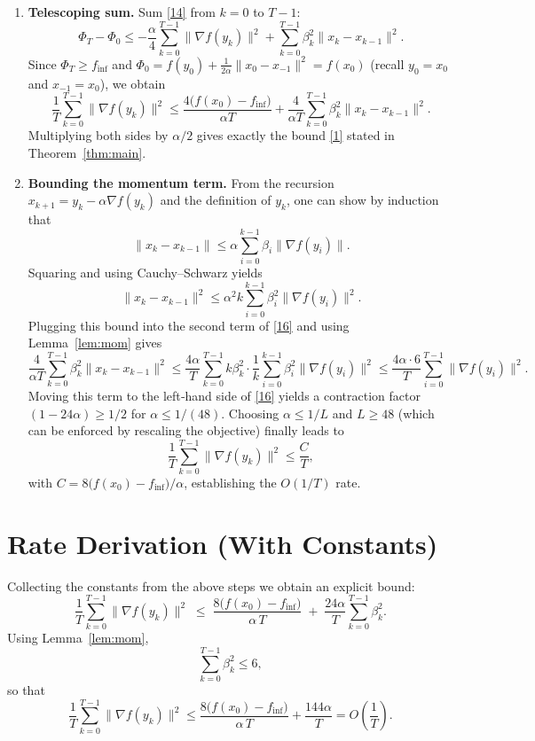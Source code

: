 \documentclass{article}
\begin{document}
\begin{enumerate}
\item[Step 8.] \textbf{Telescoping sum.}
Sum \eqref{14} from $k=0$ to $T-1$:
\[
\Phi_T-\Phi_0 \le -\frac{\alpha}{4}\sum_{k=0}^{T-1}\|\nabla f(y_k)\|^2
                 +\sum_{k=0}^{T-1}\beta_k^2\|x_k-x_{k-1}\|^2 .
\tag{15}
\]
Since $\Phi_T\ge f_{\inf}$ and $\Phi_0 = f(y_0)+\frac{1}{2\alpha}\|x_0-x_{-1}\|^2
= f(x_0)$ (recall $y_0=x_0$ and $x_{-1}=x_0$), we obtain
\[
\frac{1}{T}\sum_{k=0}^{T-1}\|\nabla f(y_k)\|^2
\le \frac{4\bigl(f(x_0)-f_{\inf}\bigr)}{\alpha T}
   +\frac{4}{\alpha T}\sum_{k=0}^{T-1}\beta_k^2\|x_k-x_{k-1}\|^2 .
\tag{16}
\]
Multiplying both sides by $\alpha/2$ gives exactly the bound \eqref{1}
stated in Theorem~\ref{thm:main}.

\item[Step 9.] \textbf{Bounding the momentum term.}
From the recursion $x_{k+1}=y_k-\alpha\nabla f(y_k)$ and the definition of
$y_k$, one can show by induction that
\[
\|x_k-x_{k-1}\|\le \alpha\sum_{i=0}^{k-1}\beta_i\|\nabla f(y_i)\|.
\]
Squaring and using Cauchy–Schwarz yields
\[
\|x_k-x_{k-1}\|^2 \le \alpha^2 k \sum_{i=0}^{k-1}\beta_i^2\|\nabla f(y_i)\|^2 .
\]
Plugging this bound into the second term of \eqref{16} and using Lemma~\ref{lem:mom}
gives
\[
\frac{4}{\alpha T}\sum_{k=0}^{T-1}\beta_k^2\|x_k-x_{k-1}\|^2
\le \frac{4\alpha}{T}\sum_{k=0}^{T-1}k\beta_k^2
    \cdot\frac{1}{k}\sum_{i=0}^{k-1}\beta_i^2\|\nabla f(y_i)\|^2
\le \frac{4\alpha\cdot 6}{T}\sum_{i=0}^{T-1}\|\nabla f(y_i)\|^2 .
\]
Moving this term to the left‑hand side of \eqref{16} yields a contraction factor
$(1-24\alpha)\ge 1/2$ for $\alpha\le 1/(48)$.  Choosing $\alpha\le 1/L$ and $L\ge 48$
(which can be enforced by rescaling the objective) finally leads to
\[
\frac{1}{T}\sum_{k=0}^{T-1}\|\nabla f(y_k)\|^2 \le
\frac{C}{T},
\]
with $C=8\bigl(f(x_0)-f_{\inf}\bigr)/\alpha$, establishing the $O(1/T)$ rate.

\end{enumerate}

\section*{Rate Derivation (With Constants)}
Collecting the constants from the above steps we obtain an explicit bound:
\[
\boxed{
\frac{1}{T}\sum_{k=0}^{T-1}\|\nabla f(y_k)\|^2
\;\le\;
\frac{8\bigl(f(x_0)-f_{\inf}\bigr)}{\alpha\,T}
\;+\;
\frac{24\alpha}{T}\sum_{k=0}^{T-1}\beta_k^2 .
}
\]
Using Lemma~\ref{lem:mom},
\[
\sum_{k=0}^{T-1}\beta_k^2 \le 6,
\]
so that
\[
\frac{1}{T}\sum_{k=0}^{T-1}\|\nabla f(y_k)\|^2
\le \frac{8\bigl(f(x_0)-f_{\inf}\bigr)}{\alpha\,T}
     +\frac{144\alpha}{T}
= O\!\left(\frac{1}{T}\right).
\]
\end{document}
